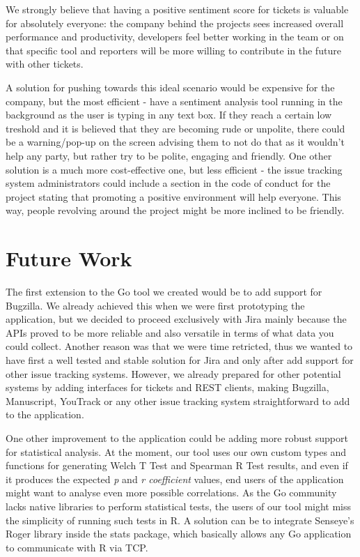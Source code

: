 \documentclass{mpaper}
\begin{document}
We strongly believe that having a positive sentiment score for tickets is valuable for absolutely everyone: the company
behind the projects sees increased overall performance and productivity, developers feel better working in the team or
on that specific tool and reporters will be more willing to contribute in the future with other tickets.

A solution for pushing towards this ideal scenario would be expensive for the company, but the most efficient - have a 
sentiment analysis tool running in the background as the user is typing in any text box. If they reach a certain low 
treshold and it is believed that they are becoming rude or unpolite, there could be a warning/pop-up on the screen advising 
them to not do that as it wouldn't help any party, but rather try to be polite, engaging and friendly. One other solution
is a much more cost-effective one, but less efficient - the issue tracking system administrators could include a section 
in the code of conduct for the project stating that promoting a positive environment will help everyone. This way, people 
revolving around the project might be more inclined to be friendly.

\section{Future Work}\label{future_work}

The first extension to the Go tool we created would be to add support for Bugzilla. We already achieved this 
when we were first prototyping the application, but we decided to proceed exclusively with Jira mainly because 
the APIs proved to be more reliable and also versatile in terms of what data you could collect. Another 
reason was that we were time retricted, thus we wanted to have first a well tested and stable solution for Jira and 
only after add support for other issue tracking systems. However, we already prepared for other potential systems by 
adding interfaces for tickets and REST clients, making Bugzilla, Manuscript, YouTrack or any 
other issue tracking system straightforward to add to the application.

One other improvement to the application could be adding more robust support for statistical analysis. At the moment, 
our tool uses our own custom types and functions for generating Welch T Test and Spearman R Test results, and even if 
it produces the expected \emph{p} and \emph{r coefficient} values, end users of the application might want to 
analyse even more possible correlations. As the Go community lacks native libraries to perform statistical tests, 
the users of our tool might miss the simplicity of running such tests in R. A solution can be to integrate Senseye's 
Roger library \cite{r_stats} inside the stats package, which basically allows any Go application to communicate with 
R via TCP. 
\end{document}
